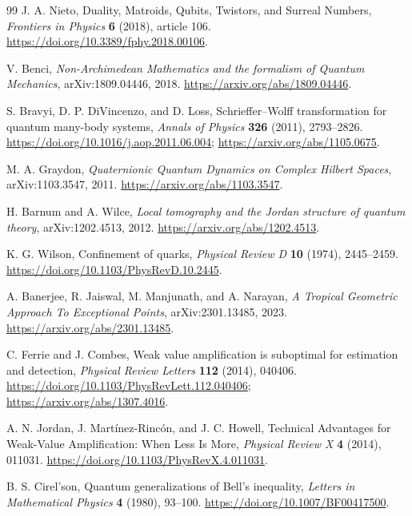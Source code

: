 \documentclass[11pt,oneside]{article}
\numberwithin{equation}{section}
\theoremstyle{plain}
\theoremstyle{definition}
\theoremstyle{remark}
\begin{document}
\begin{thebibliography}{99}
J. A. Nieto, Duality, Matroids, Qubits, Twistors, and Surreal Numbers,
\emph{Frontiers in Physics} \textbf{6} (2018), article 106.
\url{https://doi.org/10.3389/fphy.2018.00106}.

V. Benci, \emph{Non-Archimedean Mathematics and the formalism of Quantum Mechanics}, arXiv:1809.04446, 2018.
\url{https://arxiv.org/abs/1809.04446}.

S. Bravyi, D. P. DiVincenzo, and D. Loss,
Schrieffer--Wolff transformation for quantum many-body systems,
\emph{Annals of Physics} \textbf{326} (2011), 2793--2826.
\url{https://doi.org/10.1016/j.aop.2011.06.004};
\url{https://arxiv.org/abs/1105.0675}.

M. A. Graydon, \emph{Quaternionic Quantum Dynamics on Complex Hilbert Spaces}, arXiv:1103.3547, 2011.
\url{https://arxiv.org/abs/1103.3547}.

H. Barnum and A. Wilce, \emph{Local tomography and the Jordan structure of quantum theory}, arXiv:1202.4513, 2012.
\url{https://arxiv.org/abs/1202.4513}.

K. G. Wilson, Confinement of quarks, \emph{Physical Review D} \textbf{10} (1974), 2445--2459.
\url{https://doi.org/10.1103/PhysRevD.10.2445}.

A. Banerjee, R. Jaiswal, M. Manjunath, and A. Narayan,
\emph{A Tropical Geometric Approach To Exceptional Points}, arXiv:2301.13485, 2023.
\url{https://arxiv.org/abs/2301.13485}.

C. Ferrie and J. Combes, Weak value amplification is suboptimal for estimation and detection,
\emph{Physical Review Letters} \textbf{112} (2014), 040406.
\url{https://doi.org/10.1103/PhysRevLett.112.040406};
\url{https://arxiv.org/abs/1307.4016}.

A. N. Jordan, J. Mart\'inez-Rinc\'on, and J. C. Howell,
Technical Advantages for Weak-Value Amplification: When Less Is More,
\emph{Physical Review X} \textbf{4} (2014), 011031.
\url{https://doi.org/10.1103/PhysRevX.4.011031}.

B. S. Cirel'son, Quantum generalizations of Bell's inequality,
\emph{Letters in Mathematical Physics} \textbf{4} (1980), 93--100.
\url{https://doi.org/10.1007/BF00417500}.

\end{thebibliography}
\end{document}
